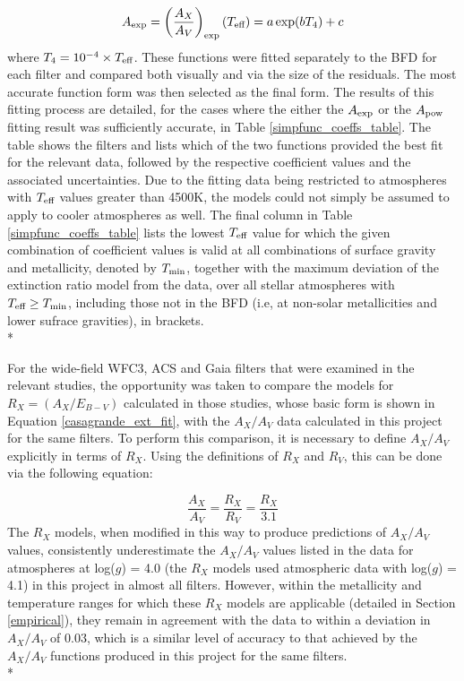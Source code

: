 \documentclass[12pt, a4paper]{report}
\begin{document}
\begin{equation}
A_{\textnormal{exp}} = \left(\frac{A_{X}}{A_{V}}\right)_{\textnormal{exp}} (T_{\textnormal{eff}}) = a \exp(b T_{4}) + c
\label{Teff_exp}
\end{equation}
where $T_{4} = 10^{-4} \times T_{\textnormal{eff}}$. These functions were fitted separately to the BFD for each filter and compared both visually and via the size of the residuals. The most accurate function form was then selected as the final form. The results of this fitting process are detailed, for the cases where the either the $A_{\textnormal{exp}}$ or the $A_{\textnormal{pow}}$ fitting result was sufficiently accurate, in Table \ref{simpfunc_coeffs_table}. The table shows the filters and lists which of the two functions provided the best fit for the relevant data, followed by the respective coefficient values and the associated uncertainties. Due to the fitting data being restricted to atmospheres with $T_{\textnormal{eff}}$ values greater than 4500K, the models could not simply be assumed to apply to cooler atmospheres as well. The final column in Table \ref{simpfunc_coeffs_table} lists the lowest $T_{\textnormal{eff}}$ value for which the given combination of coefficient values is valid at all combinations of surface gravity and metallicity, denoted by $T_{\textnormal{min}}$, together with the maximum deviation of the extinction ratio model from the data, over all stellar atmospheres with $T_{\textnormal{eff}} \geq T_{\textnormal{min}}$, including those not in the BFD (i.e, at non-solar metallicities and lower sufrace gravities), in brackets. \\*

For the wide-field WFC3, ACS \citep{2014MNRAS.444..392C} and Gaia \citep{2018MNRAS.479L.102C} filters that were examined in the relevant studies, the opportunity was taken to compare the models for $R_{X} = (A_{X}/E_{B-V})$ calculated in those studies, whose basic form is shown in Equation \ref{casagrande_ext_fit}, with the $A_{X}/A_{V}$ data calculated in this project for the same filters. To perform this comparison, it is necessary to define $A_{X}/A_{V}$ explicitly in terms of $R_{X}$. Using the definitions of $R_{X}$ and $R_{V}$, this can be done via the following equation:

\begin{equation}
\frac{A_{X}}{A_{V}} = \frac{R_{X}}{R_{V}} = \frac{R_{X}}{3.1}
\label{convert_Rx_to_Ax}
\end{equation}
The $R_{X}$ models, when modified in this way to produce predictions of $A_{X}/A_{V}$ values, consistently underestimate the $A_{X}/A_{V}$ values listed in the data for atmospheres at log($g$) = 4.0 (the $R_{X}$ models used atmospheric data with log($g$) = 4.1) in this project in almost all filters. However, within the metallicity and temperature ranges for which these $R_{X}$ models are applicable (detailed in Section \ref{empirical}), they remain in agreement with the data to within a deviation in $A_{X}/A_{V}$ of 0.03, which is a similar level of accuracy to that achieved by the $A_{X}/A_{V}$ functions produced in this project for the same filters.\\*
\end{document}
